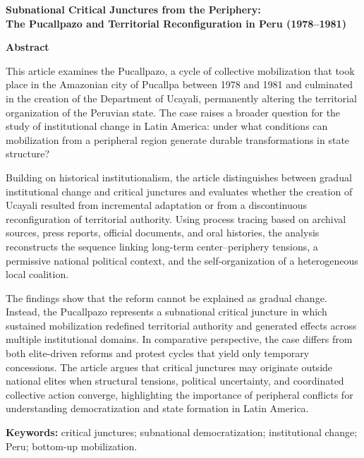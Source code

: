 \documentclass[12pt]{article}
\begin{document}
\begin{center}
  {\large\bfseries Subnational Critical Junctures from the Periphery:\\
  The Pucallpazo and Territorial Reconfiguration in Peru (1978--1981)}
\end{center}

\vspace{1em}

\noindent\textbf{Abstract}

\noindent This article examines the Pucallpazo, a cycle of collective
mobilization that took place in the Amazonian city of Pucallpa between
1978 and 1981 and culminated in the creation of the Department of
Ucayali, permanently altering the territorial organization of the
Peruvian state. The case raises a broader question for the study of
institutional change in Latin America: under what conditions can
mobilization from a peripheral region generate durable transformations
in state structure?

Building on historical institutionalism, the article distinguishes
between gradual institutional change and critical junctures and evaluates
whether the creation of Ucayali resulted from incremental adaptation or
from a discontinuous reconfiguration of territorial authority. Using
process tracing based on archival sources, press reports, official
documents, and oral histories, the analysis reconstructs the sequence
linking long-term center--periphery tensions, a permissive national
political context, and the self-organization of a heterogeneous local
coalition.

The findings show that the reform cannot be explained as gradual change.
Instead, the Pucallpazo represents a subnational critical juncture in
which sustained mobilization redefined territorial authority and generated
effects across multiple institutional domains. In comparative perspective,
the case differs from both elite-driven reforms and protest cycles that
yield only temporary concessions. The article argues that critical
junctures may originate outside national elites when structural tensions,
political uncertainty, and coordinated collective action converge,
highlighting the importance of peripheral conflicts for understanding
democratization and state formation in Latin America.

\vspace{0.5em}
\noindent\textbf{Keywords:} critical junctures; subnational
democratization; institutional change; Peru; bottom-up mobilization.
\end{document}
